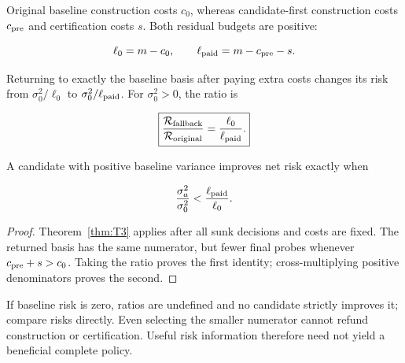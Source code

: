 \begin{proposition}\label{thm:T10}
Original baseline construction costs $c_0$, whereas candidate-first construction costs $c_{\rm pre}$ and certification costs $s$. Both residual budgets are positive:


\begin{equation}
\ell_0=m-c_0,\qquad \ell_{\rm paid}=m-c_{\rm pre}-s.
\end{equation}


Returning to exactly the baseline basis after paying extra costs changes its risk from $\sigma_0^2/\ell_0$ to $\sigma_0^2/\ell_{\rm paid}$. For $\sigma_0^2>0$, the ratio is


\begin{equation}
\boxed{\frac{\mathcal R_{\rm fallback}}{\mathcal R_{\rm original}}
=\frac{\ell_0}{\ell_{\rm paid}}.}
\end{equation}


A candidate with positive baseline variance improves net risk exactly when


\begin{equation}
\frac{\sigma_a^2}{\sigma_0^2}<\frac{\ell_{\rm paid}}{\ell_0}.
\end{equation}


\end{proposition}
\begin{proof}
Theorem~\ref{thm:T3} applies after all sunk decisions and costs are fixed. The returned basis has the same numerator, but fewer final probes whenever $c_{\rm pre}+s>c_0$. Taking the ratio proves the first identity; cross-multiplying positive denominators proves the second.

\end{proof}


If baseline risk is zero, ratios are undefined and no candidate strictly improves it; compare risks directly. Even selecting the smaller numerator cannot refund construction or certification. Useful risk information therefore need not yield a beneficial complete policy.
